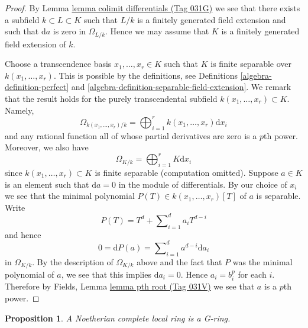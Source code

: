 \documentclass{amsart}
\theoremstyle{plain}
\newtheorem{proposition}[subsection]{Proposition}
\theoremstyle{definition}
\theoremstyle{remark}
\numberwithin{equation}{subsection}
\begin{document}
\begin{proof}
By Lemma \href{https://stacks.math.columbia.edu/tag/031G}{lemma colimit differentials (Tag 031G)} we see that there exists a subfield
$k \subset L \subset K$ such that $L/k$
is a finitely generated field extension and such that
$\text{d}a$ is zero in $\Omega_{L/k}$.
Hence we may assume that $K$ is a finitely generated field extension
of $k$.

\medskip\noindent
Choose a transcendence basis $x_1, \ldots, x_r \in K$
such that $K$ is finite separable over $k(x_1, \ldots, x_r)$.
This is possible by the definitions, see
Definitions \ref{algebra-definition-perfect} and
\ref{algebra-definition-separable-field-extension}.
We remark that the result holds for the purely transcendental
subfield $k(x_1, \ldots, x_r) \subset K$.
Namely,
$$
\Omega_{k(x_1, \ldots, x_r)/k} =
\bigoplus\nolimits_{i = 1}^r k(x_1, \ldots, x_r) \text{d}x_i
$$
and any rational function all of whose partial derivatives are zero
is a $p$th power. Moreover, we also have
$$
\Omega_{K/k} =
\bigoplus\nolimits_{i = 1}^r K\text{d}x_i
$$
since $k(x_1, \ldots, x_r) \subset K$ is finite separable
(computation omitted). Suppose $a \in K$ is an element such that
$\text{d}a = 0$ in the module of differentials. By our choice of $x_i$ we
see that the minimal polynomial $P(T) \in k(x_1, \ldots, x_r)[T]$
of $a$ is separable. Write
$$
P(T) = T^d + \sum\nolimits_{i = 1}^d a_i T^{d - i}
$$
and hence
$$
0 = \text{d}P(a) = \sum\nolimits_{i = 1}^d a^{d - i}\text{d}a_i
$$
in $\Omega_{K/k}$. By the description of
$\Omega_{K/k}$ above and the fact that $P$ was the minimal
polynomial of $a$, we see that this implies $\text{d}a_i = 0$.
Hence $a_i = b_i^p$ for each $i$. Therefore by
Fields, Lemma \href{https://stacks.math.columbia.edu/tag/031V}{lemma pth root (Tag 031V)}
we see that $a$ is a $p$th power.
\end{proof}


\begin{proposition}
\label{proposition-Noetherian-complete-G-ring}
A Noetherian complete local ring is a G-ring.
\end{proposition}
\end{document}

